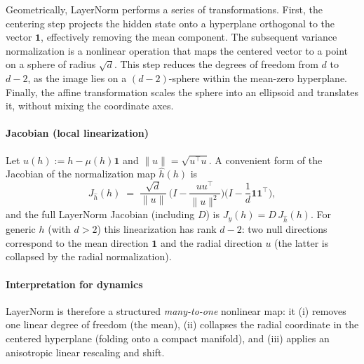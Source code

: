 \documentclass[a4paper,12pt]{article}
\begin{document}
Geometrically, LayerNorm performs a series of transformations. First, the centering step projects the hidden state onto a hyperplane orthogonal to the vector $\mathbf{1}$, effectively removing the mean component. The subsequent variance normalization is a nonlinear operation that maps the centered vector to a point on a sphere of radius $\sqrt{d}$. This step reduces the degrees of freedom from $d$ to $d-2$, as the image lies on a $(d-2)$-sphere within the mean-zero hyperplane. Finally, the affine transformation scales the sphere into an ellipsoid and translates it, without mixing the coordinate axes.

\paragraph{Jacobian (local linearization)}
Let \(u(h):=h-\mu(h)\mathbf1\) and \(\|u\|=\sqrt{u^\top u}\).  A convenient form of the Jacobian of the normalization map \(\widehat{h}(h)\) is
\[
J_{\widehat{h}}(h)
\;=\;
\frac{\sqrt{d}}{\|u\|}\,\Big(I - \frac{u u^\top}{\|u\|^2}\Big)\Big(I - \frac{1}{d}\mathbf1\mathbf1^\top\Big),
\]
and the full LayerNorm Jacobian (including \(D\)) is \(J_y(h)=D\,J_{\widehat{h}}(h)\).  For generic \(h\) (with \(d>2\)) this linearization has rank \(d-2\): two null directions correspond to the mean direction \(\mathbf1\) and the radial direction \(u\) (the latter is collapsed by the radial normalization).

\paragraph{Interpretation for dynamics} %
LayerNorm is therefore a structured \emph{many-to-one} nonlinear map: it (i) removes one linear degree of freedom (the mean), (ii) collapses the radial coordinate in the centered hyperplane (folding onto a compact manifold), and (iii) applies an anisotropic linear rescaling and shift.
\end{document}
